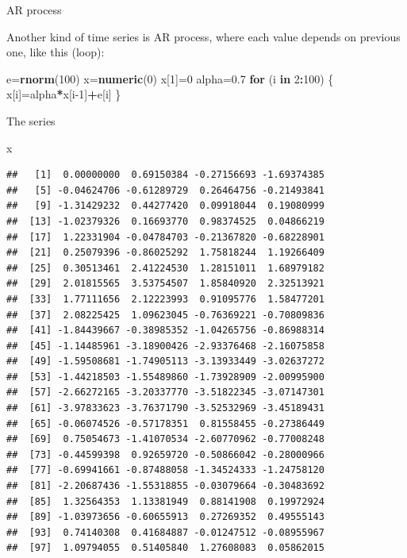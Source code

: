\documentclass[ignorenonframetext,]{beamer}
\newenvironment{Shaded}{\begin{snugshade}}{\end{snugshade}}
\newcommand{\ControlFlowTok}[1]{\textcolor[rgb]{0.13,0.29,0.53}{\textbf{#1}}}
\newcommand{\DecValTok}[1]{\textcolor[rgb]{0.00,0.00,0.81}{#1}}
\newcommand{\FloatTok}[1]{\textcolor[rgb]{0.00,0.00,0.81}{#1}}
\newcommand{\KeywordTok}[1]{\textcolor[rgb]{0.13,0.29,0.53}{\textbf{#1}}}
\newcommand{\NormalTok}[1]{#1}
\newcommand{\OperatorTok}[1]{\textcolor[rgb]{0.81,0.36,0.00}{\textbf{#1}}}
\begin{document}
\begin{frame}[fragile]{AR process}
\protect\hypertarget{ar-process}{}

Another kind of time series is AR process, where each value depends on
previous one, like this (loop):

\begin{Shaded}
\begin{Highlighting}[]
\NormalTok{e=}\KeywordTok{rnorm}\NormalTok{(}\DecValTok{100}\NormalTok{)}
\NormalTok{x=}\KeywordTok{numeric}\NormalTok{(}\DecValTok{0}\NormalTok{)}
\NormalTok{x[}\DecValTok{1}\NormalTok{]=}\DecValTok{0}
\NormalTok{alpha=}\FloatTok{0.7}
\ControlFlowTok{for}\NormalTok{ (i }\ControlFlowTok{in} \DecValTok{2}\OperatorTok{:}\DecValTok{100}\NormalTok{)}
\NormalTok{\{}
\NormalTok{  x[i]=alpha}\OperatorTok{*}\NormalTok{x[i}\DecValTok{-1}\NormalTok{]}\OperatorTok{+}\NormalTok{e[i]}
\NormalTok{\}}
\end{Highlighting}
\end{Shaded}

\end{frame}

\begin{frame}[fragile]{The series}
\protect\hypertarget{the-series-1}{}

\begin{Shaded}
\begin{Highlighting}[]
\NormalTok{x}
\end{Highlighting}
\end{Shaded}

\begin{verbatim}
##   [1]  0.00000000  0.69150384 -0.27156693 -1.69374385
##   [5] -0.04624706 -0.61289729  0.26464756 -0.21493841
##   [9] -1.31429232  0.44277420  0.09918044  0.19080999
##  [13] -1.02379326  0.16693770  0.98374525  0.04866219
##  [17]  1.22331904 -0.04784703 -0.21367820 -0.68228901
##  [21]  0.25079396 -0.86025292  1.75818244  1.19266409
##  [25]  0.30513461  2.41224530  1.28151011  1.68979182
##  [29]  2.01815565  3.53754507  1.85840920  2.32513921
##  [33]  1.77111656  2.12223993  0.91095776  1.58477201
##  [37]  2.08225425  1.09623045 -0.76369221 -0.70809836
##  [41] -1.84439667 -0.38985352 -1.04265756 -0.86988314
##  [45] -1.14485961 -3.18900426 -2.93376468 -2.16075858
##  [49] -1.59508681 -1.74905113 -3.13933449 -3.02637272
##  [53] -1.44218503 -1.55489860 -1.73928909 -2.00995900
##  [57] -2.66272165 -3.20337770 -3.51822345 -3.07147301
##  [61] -3.97833623 -3.76371790 -3.52532969 -3.45189431
##  [65] -0.06074526 -0.57178351  0.81558455 -0.27386449
##  [69]  0.75054673 -1.41070534 -2.60770962 -0.77008248
##  [73] -0.44599398  0.92659720 -0.50866042 -0.28000966
##  [77] -0.69941661 -0.87488058 -1.34524333 -1.24758120
##  [81] -2.20687436 -1.55318855 -0.03079664 -0.30483692
##  [85]  1.32564353  1.13381949  0.88141908  0.19972924
##  [89] -1.03973656 -0.60655913  0.27269352  0.49555143
##  [93]  0.74140308  0.41684887 -0.01247512 -0.08955967
##  [97]  1.09794055  0.51405840  1.27608083  0.05862015
\end{verbatim}

\end{frame}
\end{document}
